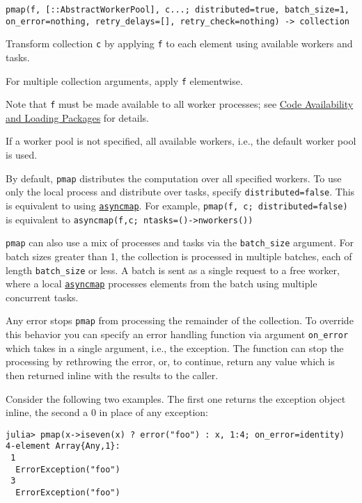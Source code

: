 \begin{adjustwidth}{2em}{0pt}


\begin{verbatim}
pmap(f, [::AbstractWorkerPool], c...; distributed=true, batch_size=1, on_error=nothing, retry_delays=[], retry_check=nothing) -> collection
\end{verbatim}

Transform collection \texttt{c} by applying \texttt{f} to each element using available workers and tasks.

For multiple collection arguments, apply \texttt{f} elementwise.

Note that \texttt{f} must be made available to all worker processes; see \href{@ref code-availability}{Code Availability and Loading Packages} for details.

If a worker pool is not specified, all available workers, i.e., the default worker pool is used.

By default, \texttt{pmap} distributes the computation over all specified workers. To use only the local process and distribute over tasks, specify \texttt{distributed=false}. This is equivalent to using \hyperlink{14148755671315265621}{\texttt{asyncmap}}. For example, \texttt{pmap(f, c; distributed=false)} is equivalent to \texttt{asyncmap(f,c; ntasks=()->nworkers())}

\texttt{pmap} can also use a mix of processes and tasks via the \texttt{batch\_size} argument. For batch sizes greater than 1, the collection is processed in multiple batches, each of length \texttt{batch\_size} or less. A batch is sent as a single request to a free worker, where a local \hyperlink{14148755671315265621}{\texttt{asyncmap}} processes elements from the batch using multiple concurrent tasks.

Any error stops \texttt{pmap} from processing the remainder of the collection. To override this behavior you can specify an error handling function via argument \texttt{on\_error} which takes in a single argument, i.e., the exception. The function can stop the processing by rethrowing the error, or, to continue, return any value which is then returned inline with the results to the caller.

Consider the following two examples. The first one returns the exception object inline, the second a 0 in place of any exception:


\begin{verbatim}
julia> pmap(x->iseven(x) ? error("foo") : x, 1:4; on_error=identity)
4-element Array{Any,1}:
 1
  ErrorException("foo")
 3
  ErrorException("foo")


\end{verbatim}
\end{adjustwidth}
